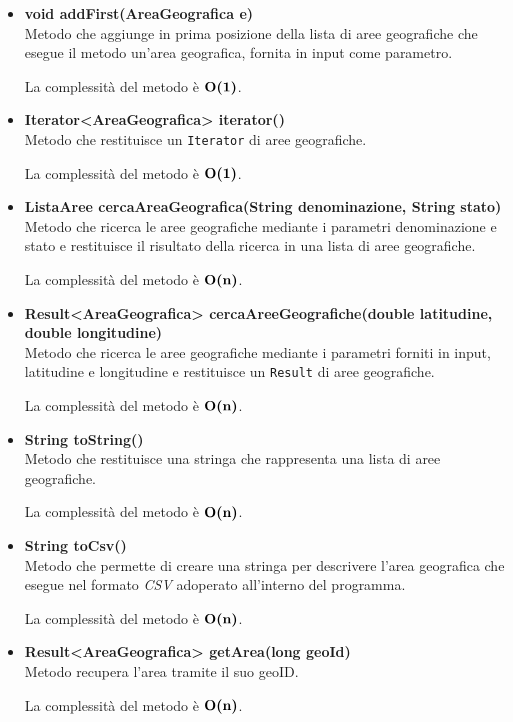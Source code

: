 \documentclass[a4paper, 12pt]{scrreprt}
\begin{document}
\begin{itemize}
				La complessit\`a del metodo \`e $\bigO\textbf{(n)}$.
				
				\item \textbf{void addFirst(AreaGeografica e)}
				\\Metodo che aggiunge in prima posizione della lista di aree geografiche che esegue il metodo un'area geografica, fornita in input come parametro.
				
				La complessit\`a del metodo \`e $\mathbf{O}\textbf{(1)}$.
				
				\item \textbf{Iterator<AreaGeografica> iterator()}
				\\Metodo che restituisce un \verb!Iterator! di aree geografiche.
				
				La complessit\`a del metodo \`e $\mathbf{O}\textbf{(1)}$.
				
				\item \textbf{ListaAree cercaAreaGeografica(String denominazione, String stato)}
				\\Metodo che ricerca le aree geografiche mediante i parametri denominazione e stato e restituisce il risultato della ricerca in una lista di aree geografiche.
				
				La complessit\`a del metodo \`e $\bigO\textbf{(n)}$.
				
				\item \textbf{Result<AreaGeografica> cercaAreeGeografiche(double latitudine, double longitudine)}
				\\Metodo che ricerca le aree geografiche mediante i parametri forniti in input, latitudine e longitudine e restituisce un \verb!Result! di aree geografiche.
				
				La complessit\`a del metodo \`e $\bigO\textbf{(n)}$.
				
				\item \textbf{String toString()}
				\\Metodo che restituisce una stringa che rappresenta una lista di aree geografiche.
				
				La complessit\`a del metodo \`e $\bigO\textbf{(n)}$.
				\pagebreak
				\item \textbf{String toCsv()}
				\\Metodo che permette di creare una stringa per descrivere l'area geografica che esegue nel formato \textsl{CSV} adoperato all'interno del programma.
				
				La complessit\`a del metodo \`e $\bigO\textbf{(n)}$.
				
				
				\item \textbf{Result<AreaGeografica> getArea(long geoId)}
				\\Metodo recupera l'area tramite il suo geoID.
				
				La complessit\`a del metodo \`e $\bigO\textbf{(n)}$.
				
			\end{itemize}
\end{document}
